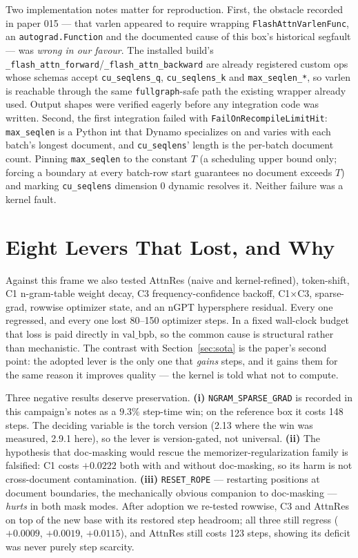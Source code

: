 \documentclass{article}
\newcommand{\valbpb}{\mathrm{val\_bpb}}
\begin{document}
Two implementation notes matter for reproduction. First, the obstacle recorded in paper 015 --- that varlen appeared to require wrapping \texttt{FlashAttnVarlenFunc}, an \texttt{autograd.Function} and the documented cause of this box's historical segfault --- was \emph{wrong in our favour}. The installed build's \texttt{\_flash\_attn\_forward}/\texttt{\_flash\_attn\_backward} are already registered custom ops whose schemas accept \texttt{cu\_seqlens\_q}, \texttt{cu\_seqlens\_k} and \texttt{max\_seqlen\_*}, so varlen is reachable through the same \texttt{fullgraph}-safe path the existing wrapper already used. Output shapes were verified eagerly before any integration code was written. Second, the first integration failed with \texttt{FailOnRecompileLimitHit}: \texttt{max\_seqlen} is a Python int that Dynamo specializes on and varies with each batch's longest document, and \texttt{cu\_seqlens}' length is the per-batch document count. Pinning \texttt{max\_seqlen} to the constant $T$ (a scheduling upper bound only; forcing a boundary at every batch-row start guarantees no document exceeds $T$) and marking \texttt{cu\_seqlens} dimension 0 dynamic resolves it. Neither failure was a kernel fault.

\section{Eight Levers That Lost, and Why}
Against this frame we also tested AttnRes (naive and kernel-refined), token-shift, C1 n-gram-table weight decay, C3 frequency-confidence backoff, C1$\times$C3, sparse-grad, rowwise optimizer state, and an nGPT hypersphere residual. Every one regressed, and every one lost 80--150 optimizer steps. In a fixed wall-clock budget that loss is paid directly in $\valbpb$, so the common cause is structural rather than mechanistic. The contrast with Section~\ref{sec:sota} is the paper's second point: the adopted lever is the only one that \emph{gains} steps, and it gains them for the same reason it improves quality --- the kernel is told what not to compute.

Three negative results deserve preservation. \textbf{(i)} \texttt{NGRAM\_SPARSE\_GRAD} is recorded in this campaign's notes as a $9.3\%$ step-time win; on the reference box it costs 148 steps. The deciding variable is the torch version (2.13 where the win was measured, 2.9.1 here), so the lever is version-gated, not universal. \textbf{(ii)} The hypothesis that doc-masking would rescue the memorizer-regularization family is falsified: C1 costs $+0.0222$ both with and without doc-masking, so its harm is not cross-document contamination. \textbf{(iii)} \texttt{RESET\_ROPE} --- restarting positions at document boundaries, the mechanically obvious companion to doc-masking --- \emph{hurts} in both mask modes. After adoption we re-tested rowwise, C3 and AttnRes on top of the new base with its restored step headroom; all three still regress ($+0.0009$, $+0.0019$, $+0.0115$), and AttnRes still costs 123 steps, showing its deficit was never purely step scarcity.
\end{document}
